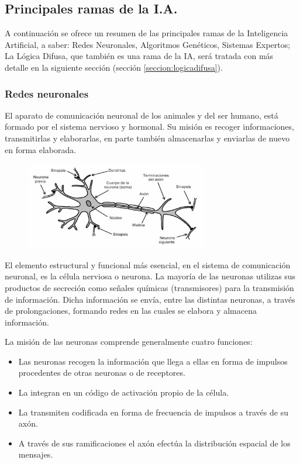 \subsection{Principales ramas de la I.A.}\label{cap:ramasdelaia}
A continuación se ofrece un resumen de las principales ramas de la Inteligencia Artificial, a saber: Redes Neuronales, Algoritmos Genéticos, Sistemas Expertos; La Lógica Difusa, que también es una rama de la IA, será tratada con más detalle en la siguiente sección (sección \ref{seccion:logicadifusa}).
\subsubsection{Redes neuronales}

El aparato de comunicación neuronal de los animales y del ser humano, está formado por el sistema nervioso y hormonal. Su misión es recoger informaciones, transmitirlas y elaborarlas, en parte también almacenarlas y enviarlas de nuevo en forma elaborada.

\begin{figure}
	\includegraphics[width=8cm]{Sources/neurona.png}
\end{figure}

El elemento estructural y funcional más esencial, en el sistema de comunicación neuronal, es la célula nerviosa o neurona. La mayoría de las neuronas utilizas sus productos de secreción como señales químicas (transmisores) para la transmisión de información. Dicha información se envía, entre las distintas neuronas, a través de prolongaciones, formando redes en las cuales se elabora y almacena información.

La misión de las neuronas comprende generalmente cuatro funciones:

{\setlength{\baselineskip}{0.7\baselineskip}
\begin{itemize}
	\item Las neuronas recogen la información que llega a ellas en forma de impulsos procedentes de otras neuronas o de receptores.
	\item La integran en un código de activación propio de la célula.
	\item La transmiten codificada en forma de frecuencia de impulsos a través de su axón. 
	\item A través de sus ramificaciones el axón efectúa la distribución espacial de los mensajes.
\end{itemize}}

